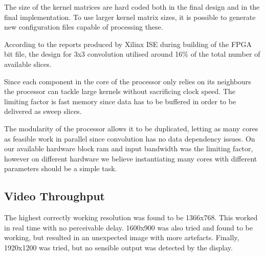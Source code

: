 The size of the kernel matrices are hard coded both in the final design and in the final implementation.
To use larger kernel matrix sizes, it is possible to generate new configuration files capable of processing these.

According to the reports produced by Xilinx ISE during building of the FPGA bit file, the design for 3x3 convolution utilised around 16\% of the total number of available slices.

Since each component in the core of the processor only relies on its neighbours the processor can tackle large kernels without sacrificing clock speed.
The limiting factor is fast memory since data has to be buffered in order to be delivered as sweep slices.

The modularity of the processor allows it to be duplicated, letting as many cores as feasible work in parallel since convolution has no data dependency issues.
On our available hardware block ram and input bandwidth was the limiting factor, however on different hardware we believe instantiating many cores with different parameters should be a simple task.

\subsection{Video Throughput}
The highest correctly working resolution was found to be 1366x768.
This worked in real time with no perceivable delay. 1600x900 was also tried and found to be working, but resulted in an unexpected image with more artefacts. Finally, 1920x1200 was tried, but no sensible output was detected by the display.

